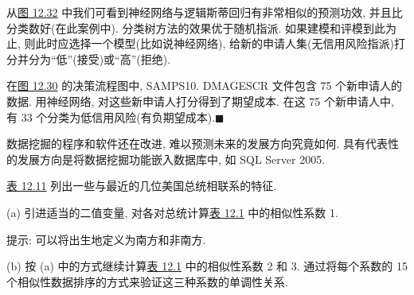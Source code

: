 \begin{mvfigure}
\begin{minipage}[t]{0.50\linewidth}
\par\vspace{8pt}
\label{fig:12.32}
\end{minipage}
\end{mvfigure}

从\hyperref[fig:12.32]{图 12.32} 中我们可看到神经网络与逻辑斯蒂回归有非常相似的预测功效, 并且比分类数好(在此案例中). 分类树方法的效果优于随机指派. 如果建模和评模到此为止, 则此时应选择一个模型(比如说神经网络), 给新的申请人集(无信用风险指派)打分并分为“低”(接受)或“高”(拒绝).

在\hyperref[fig:12.30]{图 12.30} 的决策流程图中, SAMPS10. DMAGESCR 文件包含 75 个新申请人的数据. 用神经网络, 对这些新申请人打分得到了期望成本. 在这 75 个新申请人中, 有 33 个分类为低信用风险(有负期望成本).\hfill$\blacksquare$

数据挖掘的程序和软件还在改进, 难以预测未来的发展方向究竟如何. 具有代表性的发展方向是将数据挖掘功能嵌入数据库中, 如 SQL Server 2005.


\quad \hyperref[tab:12.11]{表 12.11} 列出一些与最近的几位美国总统相联系的特征.

\noindent (a) 引进适当的二值变量, 对各对总统计算\hyperref[tab:12.1]{表 12.1} 中的相似性系数 1.

提示: 可以将出生地定义为南方和非南方.

\noindent (b) 按 (a) 中的方式继续计算\hyperref[tab:12.1]{表 12.1} 中的相似性系数 2 和 3. 通过将每个系数的 15 个相似性数据排序的方式来验证这三种系数的单调性关系.

